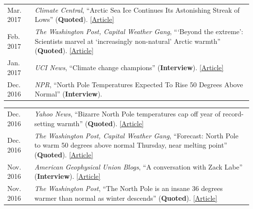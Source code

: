 \documentclass[margin,line,palatino,courier,10pt]{res}
\begin{document}
\begin{resume}
\begin{tabular}{@{}p{0.9in}p{4in}}
Mar. 2017 & \textit{Climate Central}, ``Arctic Sea Ice Continues Its Astonishing Streak of Lows'' (\textbf{Quoted}). \href{http://www.climatecentral.org/news/arctic-sea-ice-record-low-streak-21227}{[Article]}\\
Feb. 2017 & \textit{The Washington Post, Capital Weather Gang}, ```Beyond the extreme': Scientists marvel at `increasingly non-natural' Arctic warmth'' (\textbf{Quoted}). \href{https://www.washingtonpost.com/news/capital-weather-gang/wp/2017/02/01/beyond-the-extreme-scientists-marvel-at-increasingly-non-natural-arctic-warmth/?sdfsdfsdfsdfsd&utm_term=.cf3cf81d24f3}{[Article]}\\
Jan. 2017 & \textit{UCI News}, ``Climate change champions'' (\textbf{Interview}). \href{https://news.uci.edu/climate-change-champions/}{[Article]}\\
Dec. 2016 & \textit{NPR}, ``North Pole Temperatures Expected To Rise 50 Degrees Above Normal'' (\textbf{Interview}). \\
\end{tabular}
\begin{tabular}{@{}p{0.9in}p{4in}}
Dec. 2016 & \textit{Yahoo News}, ``Bizarre North Pole temperatures cap off year of record-setting warmth'' (\textbf{Quoted}). \href{https://www.yahoo.com/news/bizarre-north-pole-temperatures-cap-off-year-of-record-setting-warmth-181727978.html?soc_src=social-sh&soc_trk=tw}{[Article]}\\
Dec. 2016 & \textit{The Washington Post, Capital Weather Gang}, ``Forecast: North Pole to warm 50 degrees above normal Thursday, near melting point'' (\textbf{Quoted}). \href{https://www.washingtonpost.com/news/capital-weather-gang/wp/2016/12/20/forecast-north-pole-to-warm-50-degrees-above-normal-thursday-near-melting-point/?dfgdfgdfgdfg&utm_term=.e648369ada7e}{[Article]}\\
Nov. 2016 & \textit{American Geophysical Union Blogs}, ``A conversation with Zack Labe'' (\textbf{Interview}). \href{http://blogs.agu.org/mountainbeltway/2016/11/23/conversation-zack-labe/}{[Article]}\\
Nov. 2016 & \textit{The Washington Post}, ``The North Pole is an insane 36 degrees warmer than normal as winter descends'' (\textbf{Quoted}). \href{https://www.washingtonpost.com/news/energy-environment/wp/2016/11/17/the-north-pole-is-an-insane-36-degrees-warmer-than-normal-as-winter-descends/?utm_term=.f2cb9596b3d8}{[Article]}\\
\end{tabular}
\begin{tabular}{@{}p{0.9in}p{4in}}

\end{tabular}
\end{resume}
\end{document}
